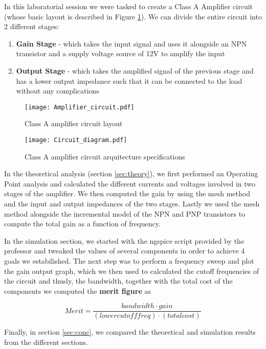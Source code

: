 \hspace{12pt} In this laboratorial session we were tasked to create a Class A Amplifier circuit (whose basic layout is described in Figure \ref{fig:amp}). We can divide the entire circuit into 2 different stages:
\vspace{-5pt}
\begin{enumerate}
	\item{\textbf{Gain Stage} - which takes the input signal and uses it alongside an NPN transistor and a supply voltage source of 12V to amplify the input}
	\vspace{-5pt}
	\item{\textbf{Output Stage} - which takes the amplified signal of the previous stage and has a lower output impedance such that it can be connected to the load without any complications}
\end{enumerate}

\begin{figure}[h]
	\centering
	\texttt{[image: Amplifier\_circuit.pdf]}
	\caption{Class A amplifier circuit layout}
	\label{fig:amp}
\end{figure}
\vspace{-10pt}
\begin{figure}[h]
 	\centering
	\texttt{[image: Circuit\_diagram.pdf]}
	\caption{Class A amplifier circuit arquitecture specifications}
	\label{fig:circuit}
\end{figure}
 
In the theoretical analysis (section \ref{sec:theory}), we first performed an Operating Point analysis and calculated the different currents and voltages involved in two stages of the amplifier. We then computed the gain by using the mesh method and the input and output impedances of the two stages. Lastly we used the mesh method alongside the incremental model of the NPN and PNP transistors to compute the total gain as a function of frequency.

In the simulation section, we started with the ngspice script provided by the professor and tweaked the values of several components in order to achieve 4 goals we estabilished. The next step was to perform a frequency sweep and plot the gain output graph, which we then used to calculated the cutoff frequencies of the circuit and thusly, the bandwidth, together with the total cost of the components we computed the \textbf{merit figure} as 

\begin{equation}
	Merit = \frac{bandwidth \cdot gain}{(lower cutoff freq) \cdot (total cost)}
\end{equation} 

Finally, in section \ref{sec:conc}, we compared the theoretical and simulation results from the different sections.

\pagebreak
